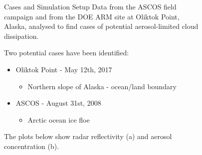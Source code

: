 \documentclass[final]{beamer}
\newlength{\sepwid}
\newlength{\onecolwid}
\newlength{\twocolwid}
\begin{document}
\begin{frame}[t]
\begin{columns}[t]
\begin{column}{\onecolwid}
	\begin{block}{Cases and Simulation Setup}
		Data from the ASCOS field campaign and from the DOE ARM site at Oliktok Point, Alaska, analysed to find cases of potential aerosol-limited cloud dissipation.

		Two potential cases have been identified:
		\begin{itemize}
			\item Oliktok Point - May 12th, 2017
			\begin{itemize}
				\item Northern slope of Alaska - ocean/land boundary
			\end{itemize}
			\item ASCOS - August 31st, 2008
			\begin{itemize}
				\item Arctic ocean ice floe
			\end{itemize}
		\end{itemize}

The plots below show radar reflectivity (a) and aerosol concentration (b).
	\end{block}
\end{column} %

\begin{column}{\sepwid}\end{column} %

\begin{column}{\twocolwid}

\end{column}



\begin{column}{\sepwid}\end{column}

\begin{column}{\onecolwid}
	
\end{column}
\begin{column}{\sepwid}\end{column} %

\end{columns} %

\end{frame} %
\end{document}
